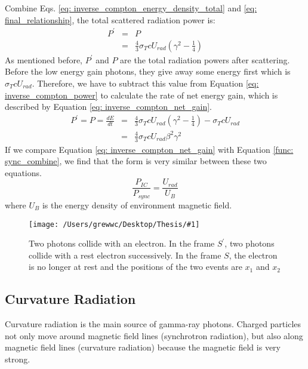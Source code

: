 \documentclass[12pt]{report}
\newcommand{\singleFig}[3]{
  \begin{figure}[!ht]
    \centering
    \texttt{[image: /Users/grewwc/Desktop/Thesis/\#1]}
    \caption{#3}
    \label{fig: #1}
  \end{figure}
}
\newcommand{\add}[1]{
  $<$\colorbox{red}{\textbf{add}}$>$#1$<$\colorbox{red}{\textbf{/add}}$>$
}
\begin{document}
            Combine Eqs. \ref{eq: inverse_compton_energy_density_total} and 
            \ref{eq: final_relationship}, the total scattered radiation power is:
            \begin{eqnarray}
              \label{eq: inverse_compton_power}
              P^{\prime} &=& P  \nonumber \\
                        &=& \frac{4}{3} \sigma_{T} c U_{rad} \left(\gamma^2 - \frac{1}{4}\right)
            \end{eqnarray}
            As mentioned before, $P^{\prime}$ and $P$ are the total radiation powers after 
            scattering. Before the 
            low energy gain photons, they give away some energy first which is $\sigma_{T} c U_{rad}$. 
            Therefore, we have to subtract this value from Equation \ref{eq: inverse_compton_power} 
            to calculate the rate of net energy gain, which is described by Equation 
            \ref{eq: inverse_compton_net_gain}.
            \begin{eqnarray}
              \label{eq: inverse_compton_net_gain}
              P^{\prime} = P = \frac{dE}{dt} &=& \frac{4}{3} \sigma_{T} c U_{rad} \left(\gamma^2 - \frac{1}{4}\right) - \sigma_{T} c U_{rad} \nonumber \\
                                            &=& \frac{4}{3} \sigma_{T} c U_{rad} \beta^{2} \gamma^{2}
            \end{eqnarray}
            If we compare Equation \ref{eq: inverse_compton_net_gain} with 
            Equation \ref{func: sync_combine}, we find that the form is very similar between these 
            two equations. 
            \begin{equation}
              \label{eq: comparision_inverse_compton_and_sync}
              \frac{P_{IC}}{P_{sync}} = \frac{U_{rad}}{U_{B}}
            \end{equation}
            where $U_{B}$ is the energy density of environment magnetic field. 

            \vspace{1cm}
            \singleFig{inverse_compton_time_interval}{0.45}{Two photons collide with an 
              electron. In the frame $S^{\prime}$, two photons collide with a rest electron 
              successively. In the frame $S$, the electron is no longer at rest and the 
              positions of the two events are $x_1$ and $x_2$}
        
        \subsection{Curvature Radiation}
          Curvature radiation is the main source of gamma-ray photons. Charged particles  
          not only move around magnetic field lines (synchrotron radiation), 
          but also along magnetic field lines (curvature radiation) because the magnetic 
          field is very strong.
\end{document}
